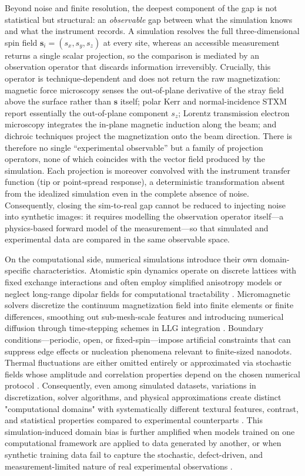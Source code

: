 \documentclass[letterpaper, 12, one column]{article}
\begin{document}
Beyond noise and finite resolution, the deepest component of the gap is not statistical but structural: an \emph{observable} gap between what the simulation knows and what the instrument records. A simulation resolves the full three-dimensional spin field $\mathbf{s}_i=(s_{x},s_{y},s_{z})$ at every site, whereas an accessible measurement returns a single scalar projection, so the comparison is mediated by an observation operator that discards information irreversibly. Crucially, this operator is technique-dependent and does not return the raw magnetization: magnetic force microscopy senses the out-of-plane derivative of the stray field above the surface rather than $\mathbf{s}$ itself; polar Kerr and normal-incidence STXM report essentially the out-of-plane component $s_{z}$; Lorentz transmission electron microscopy integrates the in-plane magnetic induction along the beam; and dichroic techniques project the magnetization onto the beam direction. There is therefore no single ``experimental observable'' but a family of projection operators, none of which coincides with the vector field produced by the simulation. Each projection is moreover convolved with the instrument transfer function (tip or point-spread response), a deterministic transformation absent from the idealized simulation even in the complete absence of noise. Consequently, closing the sim-to-real gap cannot be reduced to injecting noise into synthetic images: it requires modelling the observation operator itself—a physics-based forward model of the measurement—so that simulated and experimental data are compared in the same observable space.

On the computational side, numerical simulations introduce their own domain-specific characteristics. Atomistic spin dynamics operate on discrete lattices with fixed exchange interactions and often employ simplified anisotropy models or neglect long-range dipolar fields for computational tractability \cite{Holt2025Virtual}. Micromagnetic solvers discretize the continuum magnetization field into finite elements or finite differences, smoothing out sub-mesh-scale features and introducing numerical diffusion through time-stepping schemes in LLG integration \cite{Pfeiler2022Numerical}. Boundary conditions—periodic, open, or fixed-spin—impose artificial constraints that can suppress edge effects or nucleation phenomena relevant to finite-sized nanodots. Thermal fluctuations are either omitted entirely or approximated via stochastic fields whose amplitude and correlation properties depend on the chosen numerical protocol \cite{Sudsom2021Micromagnetic}. Consequently, even among simulated datasets, variations in discretization, solver algorithms, and physical approximations create distinct "computational domains" with systematically different textural features, contrast, and statistical properties compared to experimental counterparts \cite{Feng2024}. This simulation-induced domain bias is further amplified when models trained on one computational framework are applied to data generated by another, or when synthetic training data fail to capture the stochastic, defect-driven, and measurement-limited nature of real experimental observations \cite{Hilgers2025}.
\end{document}
